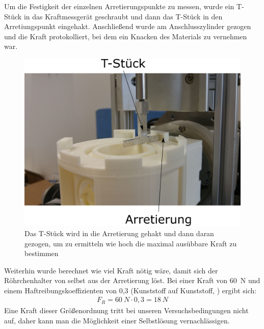 Um die Festigkeit der einzelnen Arretierungspunkte zu messen, wurde ein T-Stück in das Kraftmessgerät geschraubt und dann das T-Stück in den Arretiungspunkt eingehakt. Anschließend wurde am Anschlusszylinder gezogen und die Kraft protokolliert, bei dem ein Knacken des Materials zu vernehmen war.

\begin{figure}[h]
	\begin{center}
		\includegraphics[scale=0.6]{Messmethode_Zugkraft.png}
		\caption[Messaufbau Arretierung 2]{Das T-Stück wird in die Arretierung gehakt und dann daran gezogen, um zu ermitteln wie hoch die maximal ausübbare Kraft zu bestimmen}
	\end{center}
\end{figure}

Weiterhin wurde berechnet wie viel Kraft nötig wäre, damit sich der Röhrchenhalter von selbst aus der Arretierung löst. Bei einer Kraft von \SI{60}{N} und einem Haftreibungskoeffizienten von 0,3 (Kunststoff auf Kunststoff, \cite{Schumann2011}) ergibt sich:
\begin{align*}
F_R = \SI{60}{N} \cdot 0,3 = \SI{18}{N}
\end{align*}
Eine Kraft dieser Größenordnung tritt bei unseren Versuchsbedingungen nicht auf, daher kann man die Möglichkeit einer Selbstlösung vernachlässigen.

